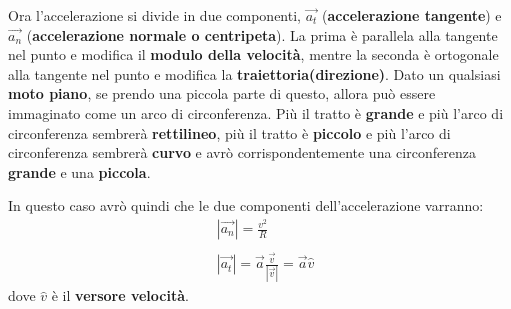
				Ora l'accelerazione si divide in due componenti, $\vec{a_t}$ (\textbf{accelerazione tangente}) e $\vec{a_n}$ (\textbf{accelerazione normale o centripeta}). La prima è parallela alla tangente nel punto e modifica il \textbf{modulo della velocità}, mentre la seconda è ortogonale alla tangente nel punto e modifica la \textbf{traiettoria(direzione)}.
				Dato un qualsiasi \textbf{moto piano}, se prendo una piccola parte di questo, allora può essere immaginato come un arco di circonferenza. Più il tratto è \textbf{grande} e più l'arco di circonferenza sembrerà \textbf{rettilineo}, più il tratto è \textbf{piccolo} e più l'arco di circonferenza sembrerà \textbf{curvo} e avrò corrispondentemente una circonferenza \textbf{grande} e una \textbf{piccola}.


				In questo caso avrò quindi che le due componenti dell'accelerazione varranno:
				\begin{align*}
					&|\vec{a_n}|=\frac{v^2}{R}\\\\
					&|\vec{a_t}|=\vec{a}\frac{\vec{v}}{|\vec{v}|}=\vec{a}\hat{v}
				\end{align*}
				dove $\hat{v}$ è il \textbf{versore velocità}.
